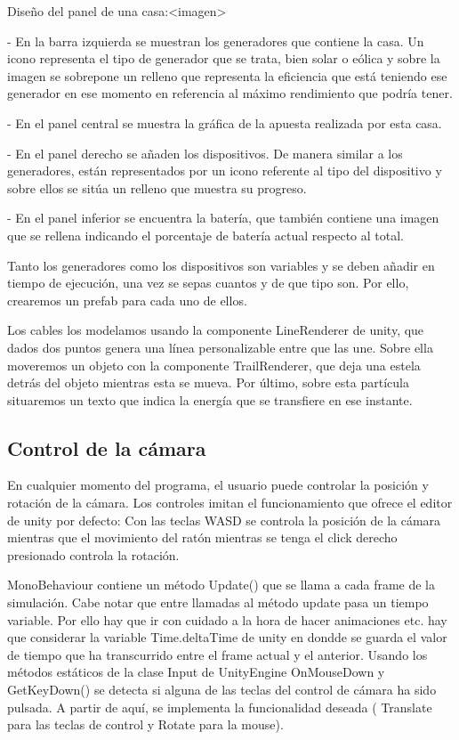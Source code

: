 \documentclass[12pt,a4paper,openright,oneside]{article}
\numberwithin{equation}{section}
\theoremstyle{definition}
\begin{document}
Diseño del panel de una casa:<imagen>

- En la barra izquierda se muestran los generadores que contiene la casa. Un icono representa el tipo de generador que se trata, bien solar o eólica y sobre la imagen se sobrepone un relleno que representa la eficiencia que está teniendo ese generador en ese momento en referencia al máximo rendimiento que podría tener.

- En el panel central se muestra la gráfica de la apuesta realizada por esta casa.

- En el panel derecho se añaden los dispositivos. De manera similar a los generadores, están representados por un icono referente al tipo del dispositivo y sobre ellos se sitúa un relleno que muestra su progreso. 

- En el panel inferior se encuentra la batería, que también contiene una imagen que se rellena indicando el porcentaje de batería actual respecto al total.

Tanto los generadores como los dispositivos son variables y se deben añadir en tiempo de ejecución, una vez se sepas cuantos y de que tipo son. Por ello, crearemos un prefab para cada uno de ellos.

Los cables los modelamos usando la componente LineRenderer de unity, que dados dos puntos genera una línea personalizable entre que las une. Sobre ella moveremos un objeto con la componente TrailRenderer, que deja una estela detrás del objeto mientras esta se mueva. Por último, sobre esta partícula situaremos un texto que indica la energía que se transfiere en ese instante.


\subsection{Control de la cámara}
En cualquier momento del programa, el usuario puede controlar la posición y rotación de la cámara. Los controles imitan el funcionamiento que ofrece el editor de unity por defecto: Con las teclas WASD se controla la posición de la cámara mientras que el movimiento del ratón mientras se tenga el click derecho presionado controla la rotación. 

MonoBehaviour contiene un método Update() que se llama a cada frame de la simulación. Cabe notar que entre llamadas al método update pasa un tiempo variable. Por ello hay que ir con cuidado a la hora de hacer animaciones etc. hay que considerar la variable Time.deltaTime de unity en dondde se guarda el valor de tiempo que ha transcurrido entre el frame actual y el anterior. Usando los métodos estáticos de la clase Input de UnityEngine OnMouseDown y GetKeyDown() se detecta si alguna de las teclas del control de cámara ha sido pulsada. A partir de aquí, se implementa la funcionalidad deseada ( Translate para las teclas de control y Rotate para la mouse).
\end{document}
